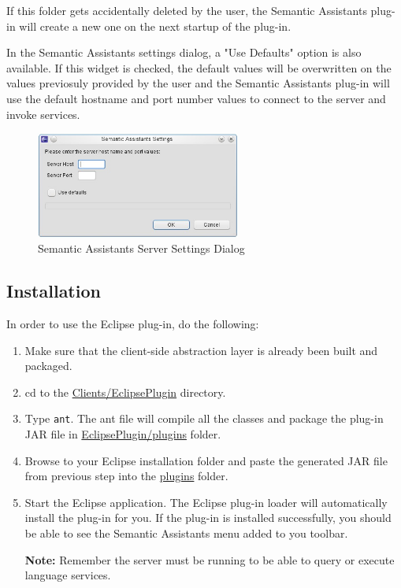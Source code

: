 If this folder gets accidentally deleted by the user, the Semantic Assistants
plug-in will create a new one on the next startup of the plug-in.

In the Semantic Assistants settings dialog, a "Use Defaults" option is also
available. If this widget is checked, the default values will be overwritten on
the values previosuly provided by the user and the Semantic Assistants plug-in
will use the default hostname and port number values to connect to the server
and invoke services.
\begin{figure}[htb]
\begin{center}
  \includegraphics[width=0.6\textwidth]{pictures/eclipse_settings.jpg}
  \caption{Semantic Assistants Server Settings Dialog}
  \label{fig:eclipse_settings}
\end{center}
\end{figure}

\subsection{Installation}
\label{subsec:eclipse_install}
In order to use the Eclipse plug-in, do the following:

\begin{enumerate}

  \item Make sure that the client-side abstraction layer is already been built
and packaged.

  \item cd to the \url{Clients/EclipsePlugin} directory.

  \item Type \texttt{ant}. The ant file will compile all the classes and package
the plug-in JAR file in \url{EclipsePlugin/plugins} folder.

  \item Browse to your Eclipse installation folder and paste the generated JAR
file from previous step into the \url{plugins} folder.
  
  \item Start the Eclipse application. The Eclipse plug-in loader will
automatically install the plug-in for you. If the plug-in is installed
successfully, you should be able to see the Semantic Assistants menu added to
you toolbar.

  \textbf{Note:} Remember the server must be running to be able to query or
execute language services.

\end{enumerate}

